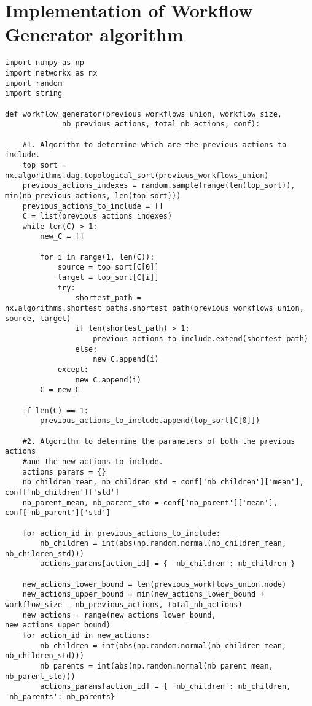 

\chapter{Implementation of Workflow Generator algorithm}
\label{app:workflow_generator_implementation}
\begin{singlespace}
\begin{lstlisting}
import numpy as np
import networkx as nx
import random
import string

def workflow_generator(previous_workflows_union, workflow_size,
             nb_previous_actions, total_nb_actions, conf):
           
    #1. Algorithm to determine which are the previous actions to include.
    top_sort = nx.algorithms.dag.topological_sort(previous_workflows_union)
    previous_actions_indexes = random.sample(range(len(top_sort)), min(nb_previous_actions, len(top_sort)))
    previous_actions_to_include = []
    C = list(previous_actions_indexes)
    while len(C) > 1:
        new_C = []
        
        for i in range(1, len(C)):
            source = top_sort[C[0]]
            target = top_sort[C[i]]
            try:
                shortest_path = nx.algorithms.shortest_paths.shortest_path(previous_workflows_union, source, target)
                if len(shortest_path) > 1:
                    previous_actions_to_include.extend(shortest_path)
                else:
                    new_C.append(i)
            except:
                new_C.append(i)
        C = new_C
    
    if len(C) == 1:
        previous_actions_to_include.append(top_sort[C[0]])
    
    #2. Algorithm to determine the parameters of both the previous actions
    #and the new actions to include.
    actions_params = {}
    nb_children_mean, nb_children_std = conf['nb_children']['mean'], conf['nb_children']['std']
    nb_parent_mean, nb_parent_std = conf['nb_parent']['mean'], conf['nb_parent']['std']
    
    for action_id in previous_actions_to_include:
        nb_children = int(abs(np.random.normal(nb_children_mean, nb_children_std)))
        actions_params[action_id] = { 'nb_children': nb_children }
    
    new_actions_lower_bound = len(previous_workflows_union.node)
    new_actions_upper_bound = min(new_actions_lower_bound + workflow_size - nb_previous_actions, total_nb_actions)
    new_actions = range(new_actions_lower_bound, new_actions_upper_bound)
    for action_id in new_actions:
        nb_children = int(abs(np.random.normal(nb_children_mean, nb_children_std)))
        nb_parents = int(abs(np.random.normal(nb_parent_mean, nb_parent_std)))
        actions_params[action_id] = { 'nb_children': nb_children, 'nb_parents': nb_parents}
        

\end{lstlisting}
\end{singlespace}
